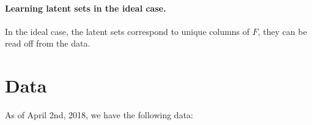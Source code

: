 \documentclass{article}
\begin{document}
\paragraph{Learning latent sets in the ideal case.}
In the ideal case, the latent sets correspond to unique columns of $F$, they can be read off from the data.

\section{Data}

As of April 2nd, 2018, we have the following data:



\printbibliography
\end{document}
